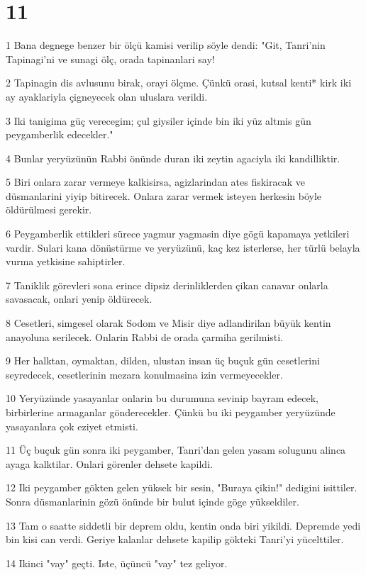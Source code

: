 \chapter{11}

\par 1 Bana degnege benzer bir ölçü kamisi verilip söyle dendi: "Git, Tanri'nin Tapinagi'ni ve sunagi ölç, orada tapinanlari say!
\par 2 Tapinagin dis avlusunu birak, orayi ölçme. Çünkü orasi, kutsal kenti* kirk iki ay ayaklariyla çigneyecek olan uluslara verildi.
\par 3 Iki tanigima güç verecegim; çul giysiler içinde bin iki yüz altmis gün peygamberlik edecekler."
\par 4 Bunlar yeryüzünün Rabbi önünde duran iki zeytin agaciyla iki kandilliktir.
\par 5 Biri onlara zarar vermeye kalkisirsa, agizlarindan ates fiskiracak ve düsmanlarini yiyip bitirecek. Onlara zarar vermek isteyen herkesin böyle öldürülmesi gerekir.
\par 6 Peygamberlik ettikleri sürece yagmur yagmasin diye gögü kapamaya yetkileri vardir. Sulari kana dönüstürme ve yeryüzünü, kaç kez isterlerse, her türlü belayla vurma yetkisine sahiptirler.
\par 7 Taniklik görevleri sona erince dipsiz derinliklerden çikan canavar onlarla savasacak, onlari yenip öldürecek.
\par 8 Cesetleri, simgesel olarak Sodom ve Misir diye adlandirilan büyük kentin anayoluna serilecek. Onlarin Rabbi de orada çarmiha gerilmisti.
\par 9 Her halktan, oymaktan, dilden, ulustan insan üç buçuk gün cesetlerini seyredecek, cesetlerinin mezara konulmasina izin vermeyecekler.
\par 10 Yeryüzünde yasayanlar onlarin bu durumuna sevinip bayram edecek, birbirlerine armaganlar gönderecekler. Çünkü bu iki peygamber yeryüzünde yasayanlara çok eziyet etmisti.
\par 11 Üç buçuk gün sonra iki peygamber, Tanri'dan gelen yasam solugunu alinca ayaga kalktilar. Onlari görenler dehsete kapildi.
\par 12 Iki peygamber gökten gelen yüksek bir sesin, "Buraya çikin!" dedigini isittiler. Sonra düsmanlarinin gözü önünde bir bulut içinde göge yükseldiler.
\par 13 Tam o saatte siddetli bir deprem oldu, kentin onda biri yikildi. Depremde yedi bin kisi can verdi. Geriye kalanlar dehsete kapilip gökteki Tanri'yi yücelttiler.
\par 14 Ikinci "vay" geçti. Iste, üçüncü "vay" tez geliyor.
